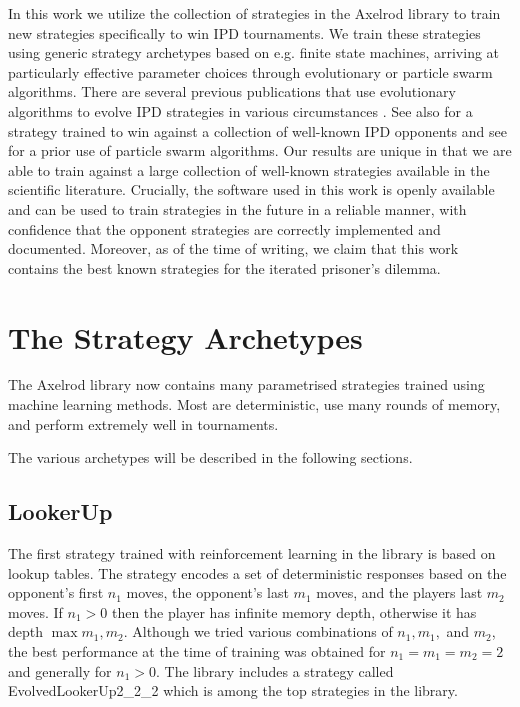 \documentclass{article}
\begin{document}
In this work we utilize the collection of strategies in the Axelrod library
to train new strategies specifically to win IPD tournaments. We train these
strategies using generic strategy archetypes based on e.g. finite state
machines, arriving at particularly effective parameter choices through
evolutionary or particle swarm algorithms. There are several
previous publications that use evolutionary algorithms to
evolve IPD strategies in various circumstances
\cite{ashlock2006training, ashlock2015multiple, ashlock2006changes,
      ashlock2014shaped, ashlock2014evolution, barlow2015varying,
      fogel1993evolving, marks1989niche, sudo2015effects,
      vassiliades2010multiagent}. See also \cite{gaudesi2016exploiting} for a
strategy trained to win against a collection of well-known IPD opponents and see
\cite{franken2005particle} for a prior use of particle swarm algorithms. Our
results are unique in that we are able to train against a large collection of
well-known strategies available in the scientific literature. Crucially, the
software used in this work is openly available and can be used to train strategies
in the future in a reliable manner, with confidence that the opponent strategies
are correctly implemented and documented. Moreover, as of the time of writing,
we claim that this work contains the best known strategies for the iterated
prisoner's dilemma.

\section{The Strategy Archetypes}

The Axelrod library now contains many parametrised strategies trained using
machine learning
methods. Most are deterministic, use many rounds of memory, and perform
extremely well in tournaments.

The various archetypes will be described in the following sections.

\subsection{LookerUp}

The first strategy trained with reinforcement learning in the library is based
on lookup tables. The strategy encodes a set of deterministic responses
based on the opponent's first $n_1$ moves, the opponent's last $m_1$ moves, and
the players last $m_2$ moves. If $n_1 > 0$ then the player has infinite memory
depth, otherwise it has depth $\max{m_1, m_2}$. Although we tried various
combinations of $n_1, m_1,$ and $m_2$, the best performance at the time of
training was obtained for $n_1 = m_1 = m_2 = 2$ and generally for $n_1 > 0$.
The library includes a strategy
called EvolvedLookerUp2\_2\_2 which is among the top strategies in the library.
\end{document}
